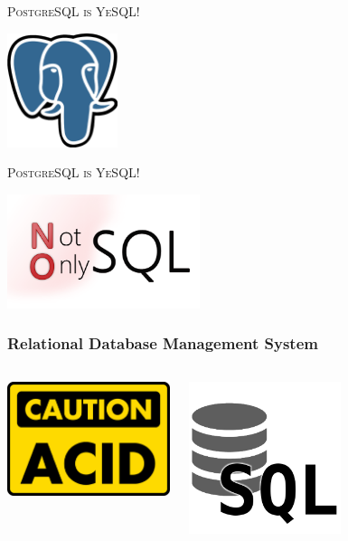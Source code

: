 \documentclass{beamer}
\begin{document}
\begin{frame}
  \begin{center}
    \textsc{\Huge PostgreSQL is YeSQL!}
    \vfill

    \includegraphics[height=9em]{postgres-logo.eps}
  \end{center}
\end{frame}

\begin{frame}
  \begin{center}
    \textsc{\Huge PostgreSQL is YeSQL!}
    \vfill

    \includegraphics[height=9em]{nosql-bigdata.png}
  \end{center}
\end{frame}

\begin{frame}
  \frametitle{Relational Database Management System}

  \begin{columns}[c]
    \begin{center}
      \includegraphics[height=9em]{caution_acid.png}
    \end{center}

    \begin{center}
      \includegraphics[height=12em]{sql.png}
    \end{center}
  \end{columns}
\end{frame}
\end{document}
